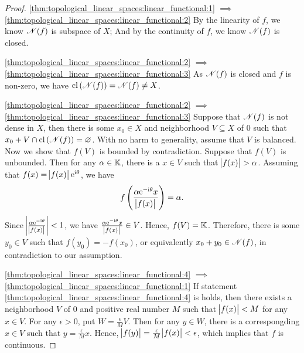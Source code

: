 \begin{proof}
\ref{thm:topological_linear_spaces:linear_functional:1}
$\implies$ 
\ref{thm:topological_linear_spaces:linear_functional:2}
By the linearity of $f$, we know $\mathscr{N}(f)$ is subspace of $X$; 
And by the continuity of $f$, we know $\mathscr{N}(f)$ is closed. 

\ref{thm:topological_linear_spaces:linear_functional:2}
$\implies$ 
\ref{thm:topological_linear_spaces:linear_functional:3}
As $\mathscr{N}(f)$ is closed and $f$ is non-zero, we have $\operatorname{cl}{(\mathscr{N}(f))} 
= \mathscr{N}(f) \neq X$. 

\ref{thm:topological_linear_spaces:linear_functional:2}
$\implies$ 
\ref{thm:topological_linear_spaces:linear_functional:3}
Suppose that $\mathscr{N}(f)$ is not dense in $X$, then there is some $x_0 \in X$ 
and neighborhood $V \subseteq X$ of $0$ such that $x_0 + V \cap 
\operatorname{cl}{(\mathscr{N}(f))} = \varnothing$. 
With no harm to generality, assume that $V$ is balanced. 
Now we show that $f(V)$ is bounded by contradiction. 
Suppose that $f(V)$ is unbounded. 
Then for any $\alpha \in \mathbb{K}$, there is a $x \in V$ such that $\abs{f(x)} > 
\alpha$. 
Assuming that $f(x) = \abs{f(x)} \mathrm{e}^{\mathrm{i} \theta}$, we have 
\begin{equation*}
    f\left( \frac{\alpha \mathrm{e}^{-\mathrm{i} \theta} x}{\abs{f(x)}} \right) 
    = \alpha. 
\end{equation*}
Since $\abs{\frac{\alpha \mathrm{e}^{-\mathrm{i} \theta}}{\abs{f(x)}}} < 1$, we have 
$\frac{\alpha \mathrm{e}^{-\mathrm{i} \theta} x}{\abs{f(x)}} \in V$. 
Hence, $f(V) = \mathbb{K}$. 
Therefore, there is some $y_0 \in V$ such that $f(y_0) = -f(x_0)$, or 
equivalently $x_0 + y_0 \in \mathscr{N}(f)$, in contradiction to our assumption. 

\ref{thm:topological_linear_spaces:linear_functional:4}
$\implies$ 
\ref{thm:topological_linear_spaces:linear_functional:1}
If statement \ref{thm:topological_linear_spaces:linear_functional:4} is 
holds, then there exists a neighborhood $V$ of $0$ and positive real number 
$M$ such that $\abs{f(x)} < M$ for any $x \in V$. 
For any $\epsilon > 0$, put $W = \frac{\epsilon}{M} V$. 
Then for any $y \in W$, there is a correspongding $x \in V$ such that 
$y = \frac{\epsilon}{M} x$. 
Hence, $\abs{f(y)} = \frac{\epsilon}{M}\abs{f(x)} < \epsilon$, which implies 
that $f$ is continuous. 
\end{proof}